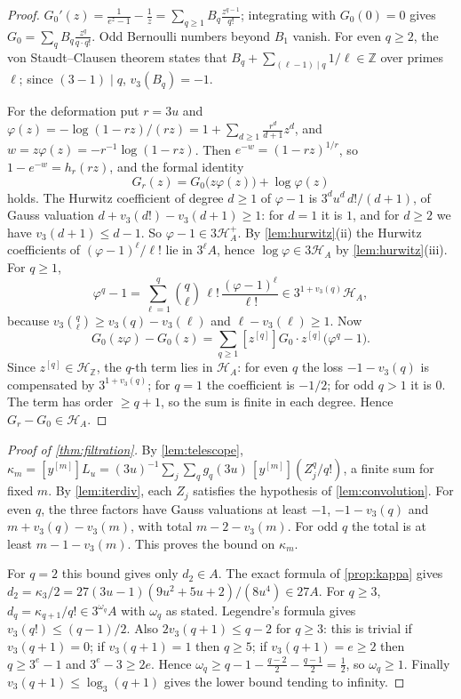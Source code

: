 \documentclass[11pt,reqno]{amsart}
\theoremstyle{definition}
\theoremstyle{remark}
\theoremstyle{plain}
\newcommand{\Z}{\mathbb Z}
\newcommand{\Hur}{\mathcal H}
\newcommand{\hc}[1]{[z^{[#1]}]}
\newcommand{\hy}[1]{[y^{[#1]}]}
\begin{document}
\begin{proof}
$G_0'(z)=\frac1{e^z-1}-\frac1z=\sum_{q\ge1}B_q\frac{z^{q-1}}{q!}$; integrating with $G_0(0)=0$ gives $G_0=\sum_qB_q\frac{z^q}{q\cdot q!}$. Odd Bernoulli numbers beyond $B_1$ vanish. For even $q\ge2$, the von Staudt–Clausen theorem \cite[Ch.~15, \S1, Thm.~3, p.~233]{IrelandRosen1990} states that $B_q+\sum_{(\ell-1)\mid q}1/\ell\in\Z$ over primes $\ell$; since $(3-1)\mid q$, $v_3(B_q)=-1$.

For the deformation put $r=3u$ and $\varphi(z)=-\log(1-rz)/(rz)=1+\sum_{d\ge1}\frac{r^d}{d+1}z^d$, and $w=z\varphi(z)=-r^{-1}\log(1-rz)$. Then $e^{-w}=(1-rz)^{1/r}$, so $1-e^{-w}=h_r(rz)$, and the formal identity
\[
G_r(z)=G_0\bigl(z\varphi(z)\bigr)+\log\varphi(z)
\]
holds. The Hurwitz coefficient of degree $d\ge1$ of $\varphi-1$ is $3^du^d\,d!/(d+1)$, of Gauss valuation $d+v_3(d!)-v_3(d+1)\ge1$: for $d=1$ it is $1$, and for $d\ge2$ we have $v_3(d+1)\le d-1$. So $\varphi-1\in3\Hur_A^+$. By \cref{lem:hurwitz}(ii) the Hurwitz coefficients of $(\varphi-1)^\ell/\ell!$ lie in $3^\ell A$, hence $\log\varphi\in3\Hur_A$ by \cref{lem:hurwitz}(iii). For $q\ge1$,
\[
\varphi^q-1=\sum_{\ell=1}^q\binom q\ell\,\ell!\,\frac{(\varphi-1)^\ell}{\ell!}\in3^{1+v_3(q)}\Hur_A,
\]
because $v_3\binom q\ell\ge v_3(q)-v_3(\ell)$ and $\ell-v_3(\ell)\ge1$. Now
\[
G_0(z\varphi)-G_0(z)=\sum_{q\ge1}\hc qG_0\cdot z^{[q]}\bigl(\varphi^q-1\bigr).
\]
Since $z^{[q]}\in\Hur_\Z$, the $q$-th term lies in $\Hur_A$: for even $q$ the loss $-1-v_3(q)$ is compensated by $3^{1+v_3(q)}$; for $q=1$ the coefficient is $-1/2$; for odd $q>1$ it is $0$. The term has order $\ge q+1$, so the sum is finite in each degree. Hence $G_r-G_0\in\Hur_A$.
\end{proof}

\begin{proof}[Proof of \cref{thm:filtration}]
By \cref{lem:telescope}, $\kappa_m=\hy mL_u=(3u)^{-1}\sum_j\sum_qg_q(3u)\,\hy m(Z_j^q/q!)$, a finite sum for fixed $m$. By \cref{lem:iterdiv}, each $Z_j$ satisfies the hypothesis of \cref{lem:convolution}. For even $q$, the three factors have Gauss valuations at least $-1$, $-1-v_3(q)$ and $m+v_3(q)-v_3(m)$, with total $m-2-v_3(m)$. For odd $q$ the total is at least $m-1-v_3(m)$. This proves the bound on $\kappa_m$.

For $q=2$ this bound gives only $d_2\in A$. The exact formula of \cref{prop:kappa} gives $d_2=\kappa_3/2=27(3u-1)(9u^2+5u+2)/(8u^4)\in27A$. For $q\ge3$, $d_q=\kappa_{q+1}/q!\in3^{\omega_q}A$ with $\omega_q$ as stated. Legendre's formula gives $v_3(q!)\le(q-1)/2$. Also $2v_3(q+1)\le q-2$ for $q\ge3$: this is trivial if $v_3(q+1)=0$; if $v_3(q+1)=1$ then $q\ge5$; if $v_3(q+1)=e\ge2$ then $q\ge3^e-1$ and $3^e-3\ge2e$. Hence $\omega_q\ge q-1-\frac{q-2}2-\frac{q-1}2=\frac12$, so $\omega_q\ge1$. Finally $v_3(q+1)\le\log_3(q+1)$ gives the lower bound tending to infinity.
\end{proof}
\end{document}
